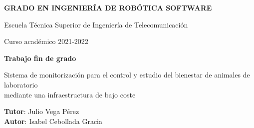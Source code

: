 \thispagestyle{empty}
\vspace{2cm}

\begin{figure}[htb]
  \centerline{}
\end{figure}

\begin{center}
  {\Large {\bf GRADO EN INGENIERÍA DE ROBÓTICA SOFTWARE}}
  \vspace{5mm}
 
  {\large {Escuela Técnica Superior de Ingeniería de Telecomunicación}}
  \vspace{5mm}

  {\large {Curso académico 2021-2022}}

  \vspace{1cm}

  {\large {\bf Trabajo fin de grado}}

  \vspace{2cm}

  {\Large {Sistema de monitorización para el control y estudio del bienestar de animales de laboratorio\\
               mediante una infraestructura de bajo coste\\[1cm] }}

  \vspace{5cm}
  {\bf Tutor}: Julio Vega Pérez \\
  {\bf Autor}: Isabel Cebollada Gracia
\end{center}

\clearpage
\thispagestyle{empty}
